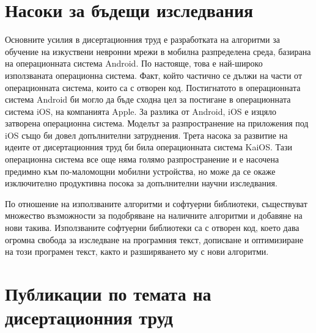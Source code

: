 \section*{Насоки за бъдещи изследвания}

Основните усилия в дисертационния труд е разработката на алгоритми за обучение на изкуствени невронни мрежи в мобилна разпределена среда, базирана на операционната система Android. По настояще, това е най-широко използваната операционна система. Факт, който частично се дължи на части от операционната система, които са с отворен код. Постигнатото в операционната система Android би могло да бъде сходна цел за постигане в операционната система iOS, на компанията Apple. За разлика от Android, iOS е изцяло затворена операционна система. Моделът за разпространение на приложения под iOS също би довел допълнителни затруднения. Трета насока за развитие на идеите от дисертационния труд би била операционната система KaiOS. Тази операционна система все още няма голямо разпространение и е насочена предимно към по-маломощни мобилни устройства, но може да се окаже изключително продуктивна посока за допълнителни научни изследвания. 

По отношение на използваните алгоритми и софтуерни библиотеки, съществуват множество възможности за подобряване на наличните алгоритми и добавяне на нови такива. Използваните софтуерни библиотеки са с отворен код, което дава огромна свобода за изследване на програмния текст, дописване и оптимизиране на този програмен текст, както и разширяването му с нови алгоритми. 

\section*{Публикации по темата на дисертационния труд}

